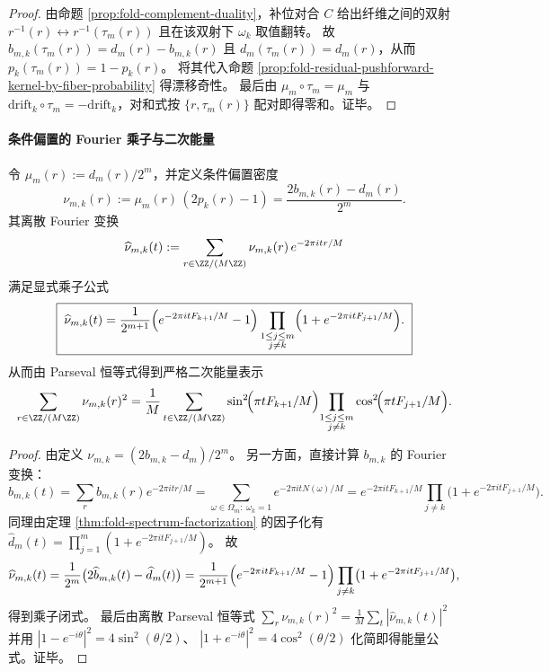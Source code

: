 \begin{proof}
由命题 \ref{prop:fold-complement-duality}，补位对合 \(C\) 给出纤维之间的双射
\(
r^{-1}(r)\leftrightarrow r^{-1}(\tau_m(r))
\)
且在该双射下 \(\omega_k\) 取值翻转。
故 \(b_{m,k}(\tau_m(r))=d_m(r)-b_{m,k}(r)\) 且 \(d_m(\tau_m(r))=d_m(r)\)，从而 \(p_k(\tau_m(r))=1-p_k(r)\)。
将其代入命题 \ref{prop:fold-residual-pushforward-kernel-by-fiber-probability} 得漂移奇性。
最后由 \(\mu_m\circ\tau_m=\mu_m\) 与 \(\mathrm{drift}_k\circ\tau_m=-\mathrm{drift}_k\)，对和式按 \(\{r,\tau_m(r)\}\) 配对即得零和。证毕。
\end{proof}

\paragraph{条件偏置的 Fourier 乘子与二次能量}
\begin{proposition}\label{prop:fold-fiber-bias-fourier-multiplier-energy}
令 \(\mu_m(r):=d_m(r)/2^m\)，并定义条件偏置密度
\[
\nu_{m,k}(r):=\mu_m(r)\,(2p_k(r)-1)=\frac{2b_{m,k}(r)-d_m(r)}{2^m}.
\]
其离散 Fourier 变换
\[
\widehat{\nu}_{m,k}(t):=\sum_{r\in\ZZ/(M\ZZ)}\nu_{m,k}(r)\,e^{-2\pi i tr/M}
\]
满足显式乘子公式
\[
\boxed{\;
\widehat{\nu}_{m,k}(t)
=\frac{1}{2^{m+1}}\Bigl(e^{-2\pi i tF_{k+1}/M}-1\Bigr)
\prod_{\substack{1\le j\le m\\ j\ne k}}\Bigl(1+e^{-2\pi i tF_{j+1}/M}\Bigr). \;}
\]
从而由 Parseval 恒等式得到严格二次能量表示
\[
\sum_{r\in\ZZ/(M\ZZ)}\nu_{m,k}(r)^2
=\frac1M\sum_{t\in\ZZ/(M\ZZ)}
\sin^2\!\Bigl(\pi tF_{k+1}/M\Bigr)\!
\prod_{\substack{1\le j\le m\\ j\ne k}}
\cos^2\!\Bigl(\pi tF_{j+1}/M\Bigr).
\]
\end{proposition}

\begin{proof}
由定义
\(
\nu_{m,k}=(2b_{m,k}-d_m)/2^m
\)。
另一方面，直接计算 \(b_{m,k}\) 的 Fourier 变换：
\[
\widehat b_{m,k}(t)
=\sum_{r}b_{m,k}(r)e^{-2\pi i tr/M}
=\sum_{\omega\in\Omega_m:\ \omega_k=1}e^{-2\pi i tN(\omega)/M}
=e^{-2\pi i tF_{k+1}/M}\prod_{j\ne k}\bigl(1+e^{-2\pi i tF_{j+1}/M}\bigr).
\]
同理由定理 \ref{thm:fold-spectrum-factorization} 的因子化有
\(
\widehat d_m(t)=\prod_{j=1}^m(1+e^{-2\pi i tF_{j+1}/M})
\)。
故
\[
\widehat\nu_{m,k}(t)
=\frac{1}{2^m}\bigl(2\widehat b_{m,k}(t)-\widehat d_m(t)\bigr)
=\frac{1}{2^{m+1}}\Bigl(e^{-2\pi i tF_{k+1}/M}-1\Bigr)\prod_{j\ne k}\bigl(1+e^{-2\pi i tF_{j+1}/M}\bigr),
\]
得到乘子闭式。
最后由离散 Parseval 恒等式
\(
\sum_r \nu_{m,k}(r)^2=\frac1M\sum_t|\widehat\nu_{m,k}(t)|^2
\)
并用
\(
|1-e^{-i\theta}|^2=4\sin^2(\theta/2)
\)、
\(
|1+e^{-i\theta}|^2=4\cos^2(\theta/2)
\)
化简即得能量公式。证毕。
\end{proof}


